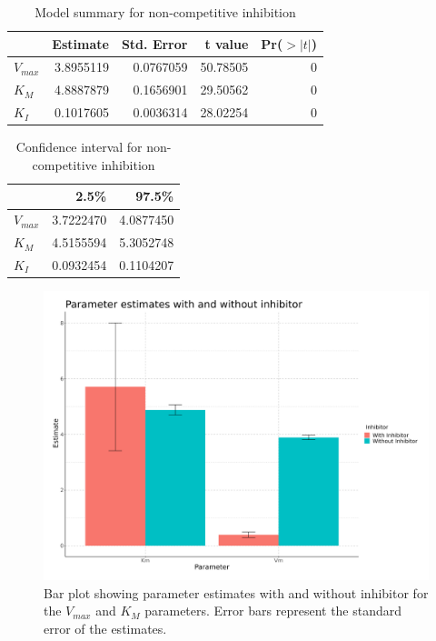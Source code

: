 \documentclass{article}
\begin{document}
\begin{table}[H]

\caption{Model summary for non-competitive inhibition}
\centering
\begin{tabular}[t]{l|r|r|r|r}
\hline
  & Estimate & Std. Error & t value & Pr($>|t|$)\\
\hline
$V_{max}$ & 3.8955119 & 0.0767059 & 50.78505 & 0\\
\hline
$K_{M}$ & 4.8887879 & 0.1656901 & 29.50562 & 0\\
\hline
$K_{I}$ & 0.1017605 & 0.0036314 & 28.02254 & 0\\
\hline
\end{tabular}
\end{table}

\begin{table}[H]

\caption{Confidence interval for non-competitive inhibition}
\centering
\begin{tabular}[t]{l|r|r}
\hline
  & 2.5\% & 97.5\%\\
\hline
$V_{max}$ & 3.7222470 & 4.0877450\\
\hline
$K_{M}$ & 4.5155594 & 5.3052748\\
\hline
$K_{I}$ & 0.0932454 & 0.1104207\\
\hline
\end{tabular}
\end{table}

\begin{figure}[H]
\centering
\includegraphics[width=1.2\textwidth, height=0.5\textheight]{plots/enzyme_hw_plot3.png}
\caption{Bar plot showing parameter estimates with and without inhibitor for the $V_{max}$ and $K_M$ parameters. 
Error bars represent the standard error of the estimates.}
\label{fig:Bar plot $V_{max}$ $K_{M}$}
\end{figure}
\end{document}
